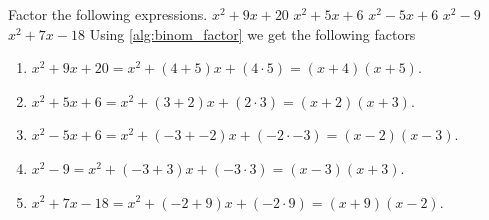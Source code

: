 \begin{ExerciseList}
\Exercise Factor the following expressions. 
\Question $x^2 + 9x + 20$
\Question $x^2 + 5x + 6$
\Question $x^2 - 5x + 6$
\Question $x^2 - 9$
\Question $x^2 + 7x - 18$
\Answer Using \ref{alg:binom_factor} we get the following factors 
\begin{enumerate}
\item\myindent $x^2 + 9x + 20 = x^2 + (4 + 5)x + (4\cdot5) = (x+4)(x+5)$.
\item\myindent $x^2 + 5x + 6 = x^2 + (3 + 2)x + (2\cdot3) = (x+2)(x+3)$.
\item\myindent $x^2 - 5x + 6 = x^2 + (-3 + -2)x + (-2\cdot-3) = (x-2)(x-3)$.
\item\myindent $x^2 - 9 = x^2  + (-3 + 3)x + (-3\cdot3) = (x-3)(x+3)$.
\item\myindent $x^2 + 7x - 18 = x^2 + (-2 + 9)x + (-2\cdot9) = (x+9)(x-2)$.
\end{enumerate}

\end{ExerciseList}
